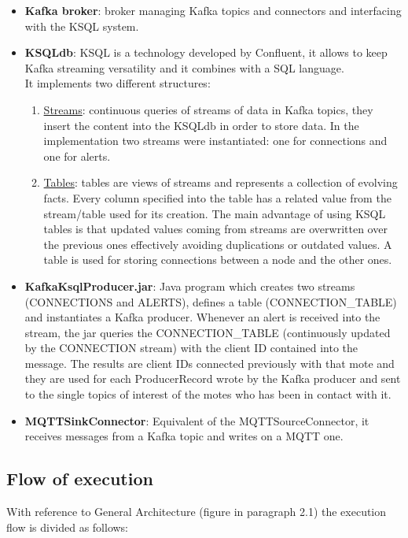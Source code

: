 \documentclass[table, 12pt]{article}
\begin{document}
\begin{itemize}
    \item \textbf{Kafka broker}: broker managing Kafka topics and connectors and interfacing with the KSQL system.
    \item \textbf{KSQLdb}: KSQL is a technology developed by Confluent, it allows to keep Kafka streaming versatility and it combines with a SQL language. \\It implements two different structures:
          \begin{enumerate}
              \item \underline{Streams}: continuous queries of streams of data in Kafka topics, they insert the content into the KSQLdb in order to store data. In the implementation two streams were instantiated: one for connections and one for alerts.
              \item \underline{Tables}: tables are views of streams and represents a collection of evolving facts. Every column specified into the table has a related value from the stream/table used for its creation. The main advantage of using KSQL tables is that updated values coming from streams are overwritten over the previous ones effectively avoiding duplications or outdated values. A table is used for storing connections between a node and the other ones.
          \end{enumerate}
    \item \textbf{KafkaKsqlProducer.jar}: Java program which creates two streams (CONNECTIONS and ALERTS), defines a table (CONNECTION\_TABLE) and instantiates a Kafka producer. Whenever an alert is received into the stream, the jar queries the CONNECTION\_TABLE (continuously updated by the CONNECTION stream) with the client ID contained into the message. The results are client IDs connected previously with that mote and they are used for each ProducerRecord wrote by the Kafka producer and sent to the single topics of interest of the motes who has been in contact with it.
    \item \textbf{MQTTSinkConnector}: Equivalent of the MQTTSourceConnector, it receives messages from a Kafka topic and writes on a MQTT one.

\end{itemize}


\subsection{Flow of execution}
With reference to General Architecture (figure in paragraph 2.1) the execution flow is divided as follows:
\end{document}
